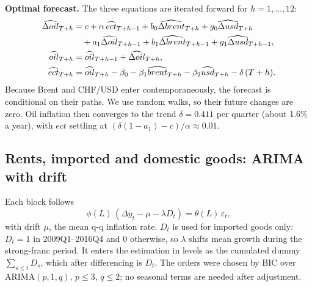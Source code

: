 \documentclass[11pt,a4paper]{article}
\begin{document}
\textbf{Optimal forecast.} The three equations are iterated forward for $h = 1,\dots,12$:
\begin{align}
  \widehat{\Delta oil}_{T+h} &= c + \alpha\,\widehat{ect}_{T+h-1} + b_0\widehat{\Delta brent}_{T+h}
     + g_0\widehat{\Delta usd}_{T+h} \notag \\
     &\quad + a_1\widehat{\Delta oil}_{T+h-1}
     + b_1\widehat{\Delta brent}_{T+h-1} + g_1\widehat{\Delta usd}_{T+h-1}, \label{eq:ecmfc1}\\
  \widehat{oil}_{T+h} &= \widehat{oil}_{T+h-1} + \widehat{\Delta oil}_{T+h}, \label{eq:ecmfc2}\\
  \widehat{ect}_{T+h} &= \widehat{oil}_{T+h} - \beta_0 - \beta_1\widehat{brent}_{T+h}
     - \beta_2\widehat{usd}_{T+h} - \delta\,(T+h). \label{eq:ecmfc3}
\end{align}
Because Brent and CHF/USD enter contemporaneously, the forecast is conditional on their paths. We
use random walks, so their future changes are zero. Oil inflation then converges to the trend
$\delta = 0.411$ per quarter (about 1.6\% a year), with $ect$ settling at
$(\delta(1-a_1)-c)/\alpha \approx 0.01$.

\subsection{Rents, imported and domestic goods: ARIMA with drift}
Each block follows
\begin{equation}\label{eq:arima}
  \phi(L)\,(\Delta y_t - \mu - \lambda D_t) = \theta(L)\,\varepsilon_t ,
\end{equation}
with drift $\mu$, the mean q-q inflation rate. $D_t$ is used for imported goods only: $D_t = 1$ in
2009Q1--2016Q4 and 0 otherwise, so $\lambda$ shifts mean growth during the strong-franc period. It
enters the estimation in levels as the cumulated dummy $\sum_{s\le t} D_s$, which after differencing is
$D_t$. The orders were chosen by BIC over ARIMA$(p,1,q)$, $p \le 3$, $q \le 2$; no seasonal terms are
needed after adjustment.
\end{document}
